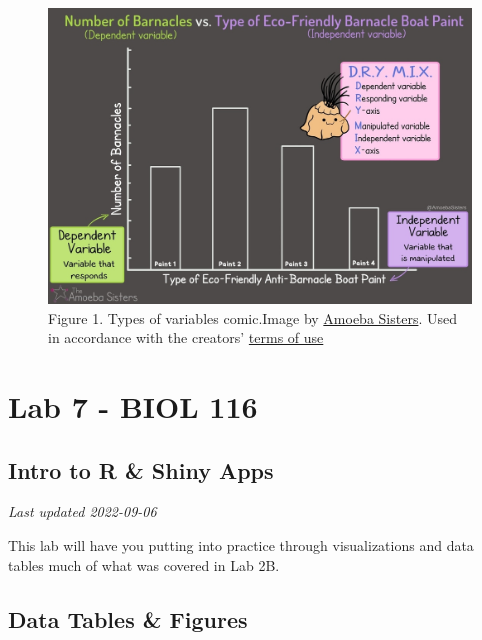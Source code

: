 \documentclass[
]{book}
\begin{document}
\begin{figure}
\centering
\includegraphics{figures_images/Lab6-Fig1.jpg}
\caption{Figure 1. Types of variables comic.Image by \href{https://www.amoebasisters.com/parameciumparlorcomics/category/nature-of-science/2}{Amoeba Sisters}. Used in accordance with the creators' \href{https://www.amoebasisters.com/termsofuse.html}{terms of use}}
\end{figure}

\hypertarget{part-lab-7---biol-116}{%
\part*{Lab 7 - BIOL 116}\label{part-lab-7---biol-116}}

\hypertarget{intro-to-r-shiny-apps}{%
\chapter*{Intro to R \& Shiny Apps}\label{intro-to-r-shiny-apps}}

\emph{Last updated 2022-09-06}

This lab will have you putting into practice through visualizations and data tables much of what was covered in Lab 2B.

\hypertarget{data-tables-figures}{%
\chapter*{Data Tables \& Figures}\label{data-tables-figures}}
\end{document}
